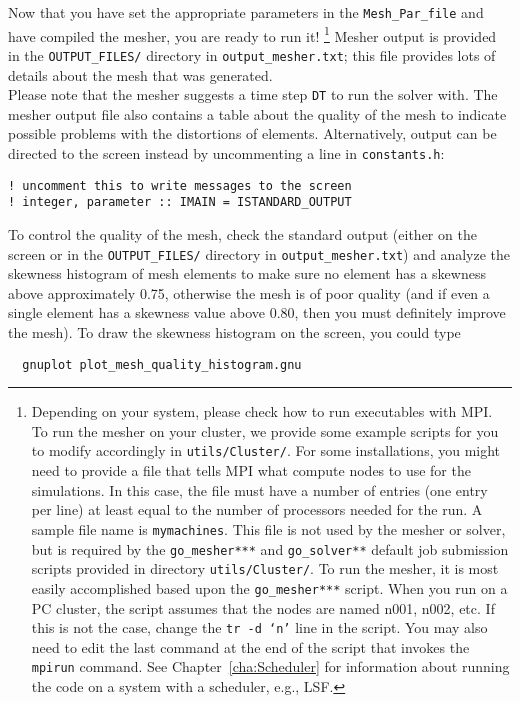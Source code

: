 Now that you have set the appropriate parameters in the \texttt{Mesh\_Par\_file}
and have compiled the mesher, you are ready to run it!
\footnote{
Depending on your system, please check how to run executables with MPI.
To run the mesher on your cluster, we provide some example scripts for you to modify accordingly in \texttt{utils/Cluster/}.
For some installations, you might need to provide a file
that tells MPI what compute nodes to use for the simulations. In this case, the
file must have a number of entries (one entry per line) at least equal
to the number of processors needed for the run.
A sample file name is \texttt{mymachines}. This file is not used by the mesher
or solver, but is required by the \texttt{go\_mesher***} and \texttt{go\_solver**}
default job submission scripts provided in directory \texttt{utils/Cluster/}.
To run the mesher, it is most easily accomplished based upon the \texttt{go\_mesher***} script.
When you run on a PC cluster, the script assumes that the nodes are
named n001, n002, etc. If this is not the case, change the \texttt{tr
-d `n'} line in the script. You may also need to edit the last command
at the end of the script that invokes the \texttt{mpirun} command.
See Chapter~\ref{cha:Scheduler}
for information about running the code on a system with a scheduler,
e.g., LSF.
}
Mesher output is provided in the \texttt{OUTPUT\_FILES/} directory
in \texttt{output\_mesher.txt}; this file provides lots of details
about the mesh that was generated.\\


Please note that the mesher suggests
a time step \texttt{DT} to run the solver with. The mesher output
file also contains a table about the quality of the mesh to indicate
possible problems with the distortions of elements. Alternatively,
output can be directed to the screen instead by uncommenting a line
in \texttt{constants.h}:
{\small
\begin{verbatim}
! uncomment this to write messages to the screen
! integer, parameter :: IMAIN = ISTANDARD_OUTPUT
\end{verbatim}}


To control the quality of the mesh, check the standard output (either
on the screen or in the \texttt{OUTPUT\_FILES/} directory in \texttt{output\_mesher.txt})
and analyze the skewness histogram of mesh elements to make sure no
element has a skewness above approximately 0.75, otherwise the mesh
is of poor quality (and if even a single element has a skewness value
above 0.80, then you must definitely improve the mesh). To draw the
skewness histogram on the screen, you could type
{\small \begin{verbatim}
  gnuplot plot_mesh_quality_histogram.gnu
\end{verbatim}}

